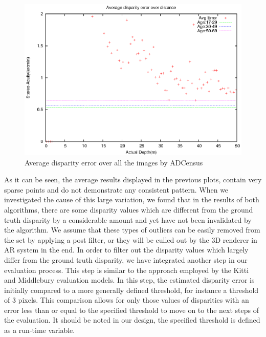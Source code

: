 \begin{figure}[H]
\centering
\includegraphics[scale=0.8]{adcenmsk1000}
\caption{Average disparity error over all the images by ADCensus}
\label{fig:mskmapadc}
\end{figure} 

As it can be seen, the average results displayed in the previous plots, contain very sparse points and 
do not demonstrate any consistent pattern. When we investigated the cause of this large variation, we found that in
the results of both algorithms, there are some disparity values which are different from the ground truth disparity 
by a considerable amount and yet have not been invalidated by the
algorithm. We assume that these types of outliers can be easily removed from the set by applying a post filter, or 
they will be culled out by the 3D renderer in AR system in the end. 
In order to filter out the disparity values which largely differ from the ground truth disparity, we have integrated another 
step in our evaluation process. This step is similar to the approach employed by the Kitti and Middlebury evaluation models.
In this step, the estimated disparity error is initially compared to a more generally defined threshold, for instance a threshold of 3 pixels.
This comparison allows for only those values of disparities with an error less than or equal to the specified threshold to 
move on to the next steps of the evaluation. It should be noted in our design, the specified threshold is defined as a run-time variable. 

